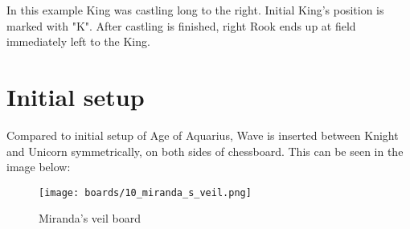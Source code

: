 In this example King was castling long to the right. Initial King's position is marked with "K".
After castling is finished, right Rook ends up at field immediately left to the King.

\clearpage %

\section*{Initial setup}

Compared to initial setup of Age of Aquarius, Wave is inserted between Knight and Unicorn
symmetrically, on both sides of chessboard. This can be seen in the image below:

\noindent
\begin{figure}[h]
\texttt{[image: boards/10\_miranda\_s\_veil.png]}
\caption{Miranda's veil board}
\label{fig:10_miranda_s_veil}
\end{figure}

\clearpage %
